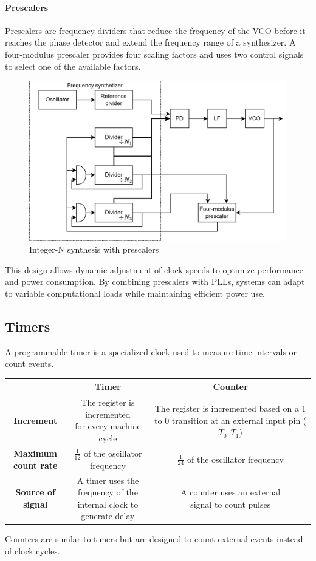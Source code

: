 \paragraph*{Prescalers}
Prescalers are frequency dividers that reduce the frequency of the VCO before it reaches the phase detector and extend the frequency range of a synthesizer. 
A four-modulus prescaler provides four scaling factors and uses two control signals to select one of the available factors. 
\begin{figure}[H]
    \centering
    \includegraphics[width=0.75\linewidth]{images/freqp.png}
    \caption{Integer-N synthesis with prescalers}
\end{figure}
This design allows dynamic adjustment of clock speeds to optimize performance and power consumption.
By combining prescalers with PLLs, systems can adapt to variable computational loads while maintaining efficient power use.

\subsection{Timers}
A programmable timer is a specialized clock used to measure time intervals or count events. 
\begin{table}[H]
    \centering
    \begin{tabular}{|c|c|c|}
    \hline
    & \textbf{Timer} & \textbf{Counter} \\ \hline
    \textbf{Increment} & \makecell{The register is incremented \\ for every machine cycle} & \makecell{The register is incremented \\ based on a 1 to 0 transition \\ at an external input pin ($T_0, T_1$)} \\ \hline
    \makecell{\textbf{Maximum} \\ \textbf{count rate}} & $\frac{1}{12}$ of the oscillator frequency & $\frac{1}{24}$ of the oscillator frequency \\ \hline
    \textbf{Source of signal} &\makecell{A timer uses the frequency of the \\ internal clock to generate delay} & \makecell{A counter uses an external \\ signal to count pulses} \\ \hline
    \end{tabular}
\end{table}
Counters are similar to timers but are designed to count external events instead of clock cycles. 

